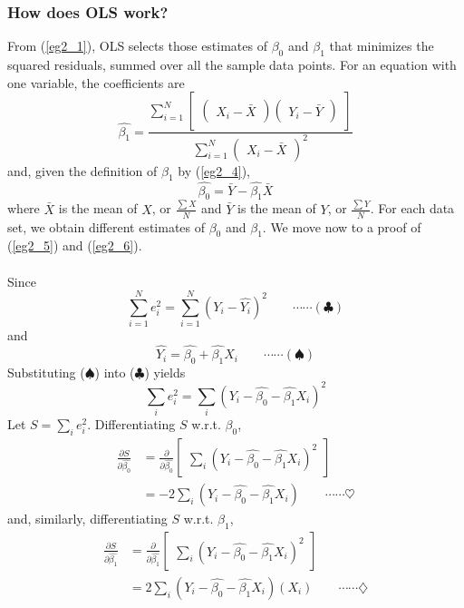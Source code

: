 \documentclass[11pt]{article}
\begin{document}
\subsubsection{How does OLS work?}
From (\ref{eg2_1}), OLS selects those estimates of $\beta_0$ and $\beta_1$ that minimizes the squared residuals, summed over all the sample data points. For an equation with one variable, the coefficients are
\begin{equation}
\hat{\beta_1} = 
\frac{\sum^N_{i=1}\begin{bmatrix}
\begin{pmatrix}
X_i-\bar{X}
\end{pmatrix}
\begin{pmatrix}
Y_i-\bar{Y}
\end{pmatrix}
\end{bmatrix}}
{\sum^N_{i=1}\begin{pmatrix}X_i - \bar{X}\end{pmatrix}^2}
\label{eg2_4}
\end{equation} 
and, given the definition of $\beta_1$ by (\ref{eg2_4}),
\begin{equation}
\hat{\beta_0}=\bar{Y}-\hat{\beta_1}\bar{X} \label{eg2_5}
\end{equation}
where $\bar{X}$ is the mean of $X$, or $\frac {\sum X}{N}$ and $\bar{Y}$ is the mean of $Y$, or $\frac {\sum Y}{N}$. For each data set, we obtain different estimates of $\beta_0$ and $\beta_1$. We move now to a proof of (\ref{eg2_5}) and (\ref{eg2_6}).\\\\
Since $$\sum^N_{i=1} e^2_i = \sum^N_{i=1}(Y_i-\hat{Y_i})^2 \quad\quad\cdots\cdots(\clubsuit)$$ 
and $$\hat{Y_i}=\hat{\beta_0}+\hat{\beta_1}X_i \quad\quad\cdots\cdots(\spadesuit)$$
Substituting ($\spadesuit$) into ($\clubsuit$) yields
$$\sum_i e_i^2 = \sum_i(Y_i-\hat{\beta_0}-\hat{\beta_1}X_i)^2 $$
Let $S =\sum_i e_i^2$. Differentiating $S$ w.r.t. $\beta_0$,
\begin{align*}
\frac{\partial S}{\partial \hat{\beta_0}} &= \frac{\partial}{\partial \hat{\beta_0}} \begin{bmatrix}
\sum_i(Y_i-\hat{\beta_0}-\hat{\beta_1}X_i)^2
\end{bmatrix} \\&=
-2\sum_i (Y_i-\hat{\beta_0}-\hat{\beta_1}X_i) \quad\quad\cdots\cdots\heartsuit
\end{align*}
and, similarly, differentiating $S$ w.r.t. $\beta_1$,
\begin{align*}
\frac{\partial S}{\partial \hat{\beta_1}} &= \frac{\partial}{\partial \hat{\beta_1}} \begin{bmatrix}
\sum_i(Y_i-\hat{\beta_0}-\hat{\beta_1}X_i)^2
\end{bmatrix} \\&=
2\sum_i (Y_i-\hat{\beta_0}-\hat{\beta_1}X_i)(X_i) \quad\quad\cdots\cdots\diamondsuit
\end{align*}
\end{document}
